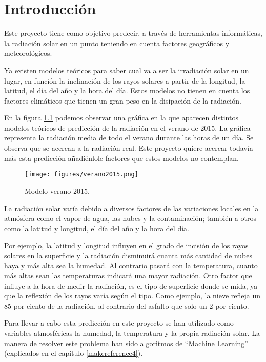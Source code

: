 \cleardoublepage

\chapter{Introducción}
\label{makereference}

Este proyecto tiene como objetivo predecir, a través de herramientas informáticas, la radiación solar en un punto teniendo en cuenta factores geográficos y meteorológicos.

Ya existen modelos teóricos para saber cual va a ser la irradiación solar en un lugar, en función la inclinación de los rayos solares a partir de la longitud, la latitud, el día del año y la hora del día. Estos modelos no tienen en cuenta los factores climáticos que tienen un gran peso en la disipación de la radiación.

En la figura \ref{modelo_verano} podemos observar una gráfica en la que aparecen distintos modelos teóricos de predicción de la radiación en el verano de 2015. La gráfica representa la radiación media de todo el verano durante las horas de un día. Se observa que se acercan a la radiación real. Este proyecto quiere acercar todavía más esta predicción añadiénlole factores que estos modelos no contemplan.

\begin{figure}[htb]
	\begin{center}
		\texttt{[image: figures/verano2015.png]}
		\caption{Modelo verano 2015. \label{modelo_verano}} 
	\end{center}
\end{figure}

La radiación solar varía debido a diversos factores de las variaciones locales en la atmósfera como el vapor de agua, las nubes y la contaminación; también a otros como la latitud y longitud, el día del año y la hora del día.

Por ejemplo, la latitud y longitud influyen en el grado de incisión de los rayos solares en la superficie y la radiación disminuirá cuanta más cantidad de nubes haya y más alta sea la humedad. Al contrario pasará con la temperatura, cuanto más altas sean las temperaturas indicará una mayor radiación. Otro factor que influye a la hora de medir la radiación, es el tipo de superficie donde se mida, ya que la reflexión de los rayos varía según el tipo. Como ejemplo, la nieve refleja un 85 por ciento de la radiación, al contrario del asfalto que solo un 2 por ciento.

Para llevar a cabo esta predicción en este proyecto se han utilizado como variables atmosféricas la humedad, la temperatura y la propia radiación solar. La manera de resolver este problema han sido algoritmos de ``Machine Learning'' (explicados en el capítulo \ref{makereference4}).

